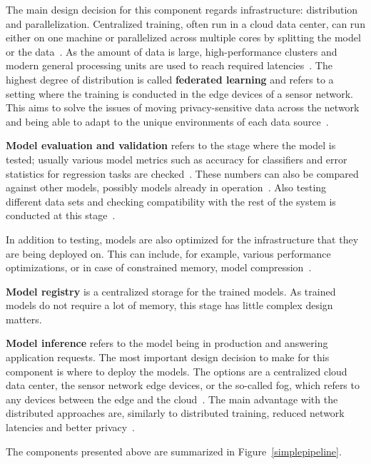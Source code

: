 The main design decision for this component regards infrastructure: distribution and parallelization. Centralized training, often run in a cloud data center, can run either on one machine or parallelized across multiple cores by splitting the model or the data~\cite{ben-nunDemystifyingParallelDistributed2019}. As the amount of data is large, high-performance clusters and modern general processing units are used to reach required latencies~\cite{iotsurvey}. The highest degree of distribution is called \textbf{federated learning} and refers to a setting where the training is conducted in the edge devices of a sensor network. This aims to solve the issues of moving privacy-sensitive data across the network and being able to adapt to the unique environments of each data source~\cite{iotsurvey}.

\textbf{Model evaluation and validation} refers to the stage where the model is tested; usually various model metrics such as accuracy for classifiers and error statistics for regression tasks are checked~\cite{iotsurvey}. These numbers can also be compared against other models, possibly models already in operation~\cite{googlemlops}. Also testing different data sets and checking compatibility with the rest of the system is conducted at this stage~\cite{googlemlops}.

In addition to testing, models are also optimized for the infrastructure that they are being deployed on. This can include, for example, various performance optimizations, or in case of constrained memory, model compression~\cite{iotsurvey}.

\textbf{Model registry} is a centralized storage for the trained models. As trained models do not require a lot of memory, this stage has little complex design matters.

\textbf{Model inference} refers to the model being in production and answering application requests.
The most important design decision to make for this component is where to deploy the models. The options are a centralized cloud data center, the sensor network edge devices, or the so-called fog, which refers to any devices between the edge and the cloud~\cite{fogsurvey}. The main advantage with the distributed approaches are, similarly to distributed training, reduced network latencies and better privacy~\cite{szeEfficientProcessingDeep2017}.

The components presented above are summarized in Figure~\ref{simplepipeline}.

